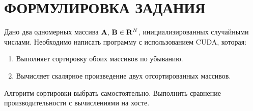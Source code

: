 \section*{ФОРМУЛИРОВКА ЗАДАНИЯ}

Дано два одномерных массива $\vb{A},\,\vb{B}\in\mathbf{R}^{N}$, инициализированных случайными числами. Необходимо написать программу с использованием CUDA, которая:
\begin{enumerate}
    \item Выполняет сортировку обоих массивов по убыванию.
    \item Вычисляет скалярное произведение двух отсортированных массивов.
\end{enumerate}
Алгоритм сортировки выбрать самостоятельно. Выполнить сравнение производительности с вычислениями на хосте.